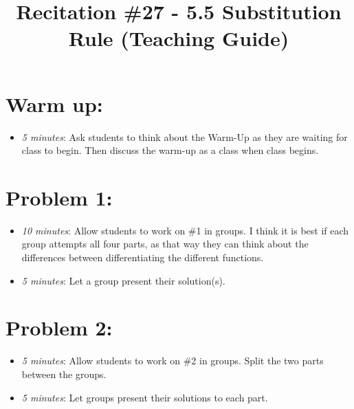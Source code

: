 \documentclass[handout,nooutcomes]{ximera}
\title{Recitation \#27 - 5.5 Substitution Rule (Teaching Guide)}
\begin{document}
\begin{abstract}		\end{abstract}
\maketitle


\section*{Warm up:} 
	
	\begin{itemize}
	
	\item  \emph{5 minutes}:  Ask students to think about the Warm-Up as they are waiting for class to begin.  Then discuss the warm-up as a class when class begins.
	
	
	
	\end{itemize}


\section*{Problem 1:}

	\begin{itemize}
	
	\item  \emph{10 minutes}:  Allow students to work on \#1 in groups.  I think it is best if each group attempts all four parts, as that way they can think about the differences between differentiating the different functions.
	
	\item  \emph{5 minutes}:  Let a group present their solution(s).
	
	\end{itemize}



\section*{Problem 2:}

	\begin{itemize}
	
	\item  \emph{5 minutes}:  Allow students to work on \#2 in groups.  Split the two parts between the groups.
		
	\item  \emph{5 minutes}:  Let groups present their solutions to each part.
			
	\end{itemize}
	
\end{document}
